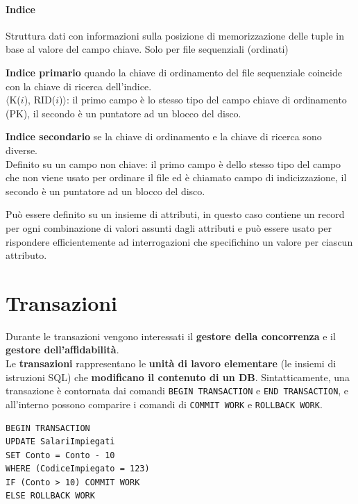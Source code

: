 \documentclass[10pt]{book}
\begin{document}
\paragraph{Indice} Struttura dati con informazioni sulla posizione di memorizzazione delle tuple in base al valore del campo chiave. Solo per file sequenziali (ordinati)
\begin{list}{}{}
	\item \textbf{Indice primario} quando la chiave di ordinamento del file sequenziale coincide con la chiave di ricerca dell'indice.\\
	$\langle$K($i$), RID($i$)$\rangle$: il primo campo è lo stesso tipo del campo chiave di ordinamento (PK), il secondo è un puntatore ad un blocco del disco.
	\item \textbf{Indice secondario} se la chiave di ordinamento e la chiave di ricerca sono diverse.\\
	Definito su un campo non chiave: il primo campo è dello stesso tipo del campo che non viene usato per ordinare il file ed è chiamato campo di indicizzazione, il secondo è un puntatore ad un blocco del disco.
\end{list}
Può essere definito su un insieme di attributi, in questo caso contiene un record per ogni combinazione di valori assunti dagli attributi e può essere usato per rispondere efficientemente ad interrogazioni che specifichino un valore per ciascun attributo.
\section{Transazioni}
Durante le transazioni vengono interessati il \textbf{gestore della concorrenza} e il \textbf{gestore dell'affidabilità}.\\
Le \textbf{transazioni} rappresentano le \textbf{unità di lavoro elementare} (le insiemi di istruzioni SQL) che \textbf{modificano il contenuto di un DB}. Sintatticamente, una transazione è contornata dai comandi \texttt{BEGIN TRANSACTION} e \texttt{END TRANSACTION}, e all'interno possono comparire i comandi di \texttt{COMMIT WORK} e \texttt{ROLLBACK WORK}.
\begin{lstlisting}
BEGIN TRANSACTION
UPDATE SalariImpiegati
SET Conto = Conto - 10
WHERE (CodiceImpiegato = 123)
IF (Conto > 10) COMMIT WORK
ELSE ROLLBACK WORK
\end{lstlisting}
\end{document}
